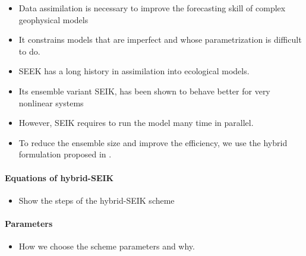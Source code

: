 \begin{itemize}
  \item Data assimilation is necessary to improve the forecasting skill of
complex geophysical models
  \item It constrains models that are imperfect and whose parametrization is
difficult to do.
  \item SEEK has a long history in assimilation into ecological models.
  \item Its ensemble variant SEIK, has been shown to behave better for very
nonlinear systems
  \item However, SEIK requires to run the model many time in parallel.
  \item To reduce the ensemble size and improve the efficiency, we use the
hybrid formulation proposed in \citet{Hamill2011}.
\end{itemize}

\paragraph{Equations of hybrid-SEIK}

\begin{itemize}
  \item Show the steps of the hybrid-SEIK scheme
\end{itemize}

\paragraph{Parameters}

\begin{itemize}
  \item How we choose the scheme parameters and why.
\end{itemize}

